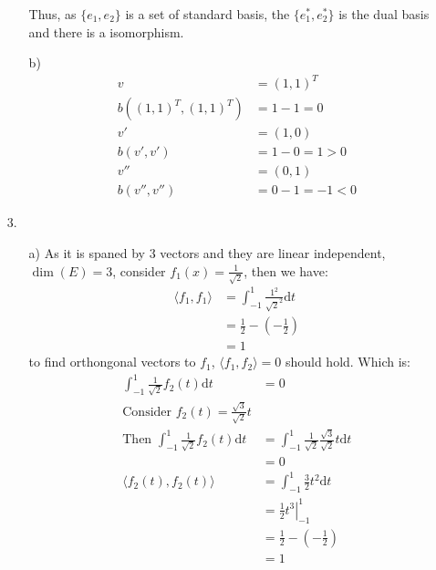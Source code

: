 \documentclass{article}
\begin{document}
\begin{itemize}
\begin{itemize}
        Thus, as \(\{e_1,e_2\}\) is a set of standard basis, the \(\{e^*_1,e^*_2\}\) is the dual basis and there is a isomorphism.
        \item [b)]
        \begin{align*}
            v&=(1,1)^T\\
            b((1,1)^T,(1,1)^T)&=1-1=0\\
            v'&=(1,0)\\
            b(v',v')&=1-0=1>0\\
            v''&=(0,1)\\
            b(v'',v'')&=0-1=-1<0
        \end{align*}
    \end{itemize}
    \item [3.]
    \begin{itemize}
        \item [a)] As it is spaned by 3 vectors and they are linear independent,\\  
                    \(\dim(E)=3\), consider \(f_1(x)=\frac{1}{\sqrt{2}}\), then we have:
                    \begin{align*}
                        \langle f_1,f_1\rangle&=\int_{-1}^1\frac{1^2}{\sqrt{2}^2} \text{d} t\\
                        &=\frac{1}{2}-\left(-\frac{1}{2}\right)\\
                        &=1
                    \end{align*}
                    to find orthongonal vectors to \(f_1\), \(\langle f_1,f_2\rangle=0\) should hold. Which is:
                    \begin{align*}
                        \int_{-1}^{1} \frac{1}{\sqrt{2}} f_2(t) \text{d}t &=0\\
                        \text{Consider }f_2(t)=\frac{\sqrt{3}}{\sqrt{2}}t\\
                        \text{Then }\int_{-1}^{1} \frac{1}{\sqrt{2}} f_2(t) \text{d}t &= \int_{-1}^{1} \frac{1}{\sqrt{2}} \frac{\sqrt{3}}{\sqrt{2}}t \text{d}t\\
                        &=0\\
                        \langle f_2(t),f_2(t) \rangle &=\int_{-1}^{1}\frac{3}{2}t^2 \text{d} t\\
                        &=\left.\frac{1}{2}t^3 \right|^1_{-1}\\
                        &=\frac{1}{2}-\left(-\frac{1}{2}\right)\\
                        &=1

\end{align*}
\end{itemize}
\end{itemize}
\end{document}
